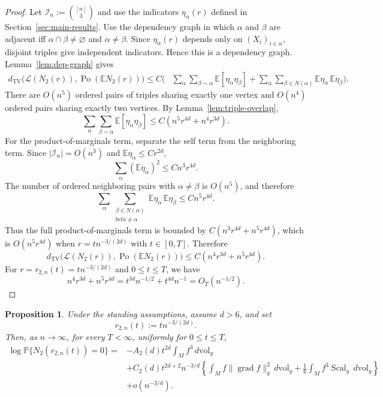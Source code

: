 \documentclass[11pt]{article}
\newtheorem{proposition}[theorem]{Proposition}
\theoremstyle{remark}
\newcommand{\Scal}{\operatorname{Scal}}
\newcommand{\grad}{\operatorname{grad}}
\newcommand{\E}{\mathbb E}
\newcommand{\Pp}{\mathbb P}
\numberwithin{equation}{section}
\begin{document}
\begin{proof}
Let $\mathcal I_n:=\binom{[n]}{3}$ and use the indicators $\eta_\alpha(r)$
defined in Section~\ref{sec:main-results}.
Use the dependency graph in which $\alpha$ and $\beta$ are adjacent iff
$\alpha\cap\beta\ne\varnothing$ and $\alpha\ne\beta$. 
Since $\eta_\alpha(r)$ depends only on $(X_i)_{i\in\alpha}$, disjoint
triples give independent indicators.  Hence this is a dependency graph.
Lemma~\ref{lem:dep-graph}
gives
\[
\begin{aligned}
d_{\mathrm{TV}}\bigl(\mathcal L(N_2(r)),\operatorname{Po}(\E N_2(r))\bigr)
\le C\Bigg(&\sum_\alpha\sum_{\beta\sim\alpha}\E[\eta_\alpha\eta_\beta]
+\sum_\alpha\sum_{\beta\in N(\alpha)}\E\eta_\alpha\,\E\eta_\beta\Bigg).
\end{aligned}
\]
There are $O(n^5)$ ordered pairs of triples sharing exactly one vertex and
$O(n^4)$ ordered pairs sharing exactly two vertices.  By
Lemma~\ref{lem:triple-overlap},
\[
\sum_\alpha\sum_{\beta\sim\alpha}\E[\eta_\alpha\eta_\beta]
\le C(n^5r^{4d}+n^4r^{3d}).
\]
For the product-of-marginals term, separate the self term from the neighboring term.
Since $|\mathcal I_n|=O(n^3)$ and $\E\eta_\alpha\le Cr^{2d}$,
\[
\sum_\alpha(\E\eta_\alpha)^2\le Cn^3r^{4d}.
\]
The number of ordered neighboring pairs with $\alpha\ne\beta$ is $O(n^5)$, and
therefore
\[
\sum_\alpha\sum_{\substack{\beta\in N(\alpha)\\beta\ne\alpha}}
\E\eta_\alpha\,\E\eta_\beta
\le Cn^5r^{4d}.
\]
Thus the full product-of-marginals term is bounded by
$C(n^3r^{4d}+n^5r^{4d})$, which is $O(n^5r^{4d})$ when
$r=t n^{-3/(2d)}$ with $t\in[0,T]$.
Therefore
\[
d_{\mathrm{TV}}\bigl(\mathcal L(N_2(r)),\operatorname{Po}(\E N_2(r))\bigr)
\le C(n^4r^{3d}+n^5r^{4d}).
\]
For $r=r_{2,n}(t)=tn^{-3/(2d)}$ and $0\le t\le T$, we have
\[
n^4r^{3d}+n^5r^{4d}
=t^{3d}n^{-1/2}+t^{4d}n^{-1}
=O_T(n^{-1/2}).
\]
\end{proof}


\begin{proposition}
\label{prop:N2-zero-count}
Under the standing assumptions, assume \(d>6\), and set
\[
r_{2,n}(t):=t n^{-3/(2d)}.
\]
Then, as \(n\to\infty\), for every \(T<\infty\), uniformly for
\(0\le t\le T\),
\[
\begin{aligned}
\log\Pp\{N_2(r_{2,n}(t))=0\}
={}&
-A_2(d)t^{2d}\int_M f^3\,d\mathrm{vol}_g\\
&+
C_2(d)t^{2d+2}n^{-3/d}
\left\{
\int_M f\|\grad f\|_g^2\,d\mathrm{vol}_g
+
\frac16\int_M f^3\Scal_g\,d\mathrm{vol}_g
\right\}\\
&+
o(n^{-3/d}).
\end{aligned}
\]
\end{proposition}
\end{document}
